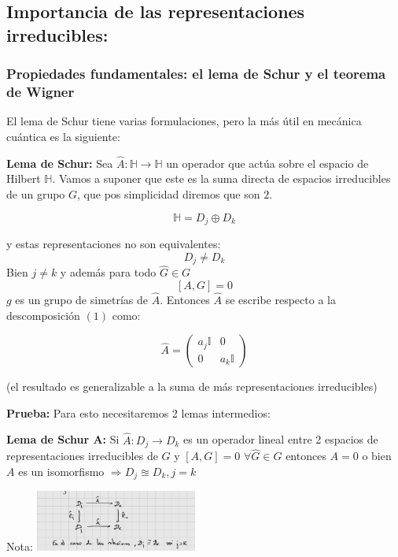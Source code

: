 \subsection{Importancia de las representaciones irreducibles:}

\subsubsection{Propiedades fundamentales: el lema de Schur y el teorema de Wigner}

El lema de Schur tiene varias formulaciones, pero la más útil en mecánica cuántica es la siguiente:

\textbf{Lema de Schur:} Sea $\hat{A}:\mathbb{H}\rightarrow\mathbb{H}$ un operador que actúa sobre el espacio de Hilbert $\mathbb{H}$. Vamos a suponer que este es la suma directa de espacios irreducibles de un grupo $G$, que pos simplicidad diremos que son $2$.

\begin{equation*}
    \mathbb{H}=D_j\oplus D_k\tag{1}
\end{equation*}

y estas representaciones no son equivalentes:
$$
D_j\neq D_k
$$
Bien $j\neq k$ y además para todo $\hat{G}\in G$
$$
\left[A,G\right]=0
$$
$g$ es un grupo de simetrías de $\hat{A}$. Entonces $\hat{A}$ se escribe respecto a la descomposición $(1)$ como:

$$
\hat{A}=\begin{pmatrix}
    a_j\mathbb{I} & 0\\
    0 & a_k\mathbb{I}
\end{pmatrix}
$$

(el resultado es generalizable a la suma de más representaciones irreducibles)

\textbf{Prueba:} Para esto necesitaremos 2 lemas intermedios:

\textbf{Lema de Schur A:} Si $\hat{A}:D_j\rightarrow D_k$ es un operador lineal entre 2 espacios de representaciones irreducibles de $G$ y $\left[A,G\right]=0$ $\forall \hat{G}\in G$ entonces $A=0$ o bien $A$ es un isomorfismo $\Rightarrow D_j\approxeq D_k,j=k$

Nota: 
\includegraphics[width=0.4\textwidth]{Graficas/G2-Aug2.png}

